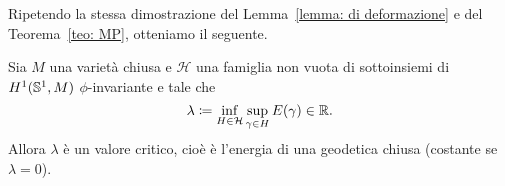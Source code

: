 Ripetendo la stessa dimostrazione del Lemma~\ref{lemma: di deformazione} e del Teorema~\ref{teo: MP}, otteniamo il seguente. 
\begin{teo}\label{teo: MP con energia}
	Sia \(M\) una varietà chiusa e \(\mathcal{H}\) una famiglia non vuota di sottoinsiemi di \(H^1(\mathbb{S}^1,M)\) \(\phi\)-invariante e tale che
	\begin{equation}\label{eq: MP level}
		\lambda \coloneq \inf_{H \in \mathcal{H}} \sup_{\gamma \in H} E(\gamma) \in \mathbb{R}.
	\end{equation}
	Allora \(\lambda\) è un valore critico, cioè è l'energia di una geodetica chiusa (costante se \(\lambda = 0\)). 
\end{teo}



